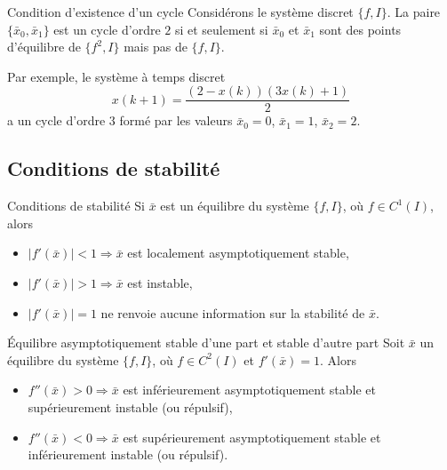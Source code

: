             \begin{theorem}{Condition d'existence d'un cycle}
                Considérons le système discret $\{f, I\}$. La paire $\{\bar{x}_0, \bar{x}_1\}$ est un cycle d'ordre $2$ si et seulement si $\bar{x}_0$ et $\bar{x}_1$ sont des points d'équilibre de $\{f^2, I\}$ mais pas de $\{f, I\}$.
            \end{theorem}
            Par exemple, le système à temps discret
            \begin{equation}
                x(k + 1) = \frac{(2 - x(k))(3x(k) + 1)}{2}
            \end{equation}
            a un cycle d’ordre $3$ formé par les valeurs $\bar{x}_0 = 0$, $\bar{x}_1 = 1$, $\bar{x}_2 = 2$.
        \subsection{Conditions de stabilité}
        \begin{theorem}{Conditions de stabilité}
            Si $\bar{x}$ est un équilibre du système $\{f, I\}$, où $f \in C^1(I)$, alors
            \begin{itemize}
                \item $|f'(\bar{x})| < 1 \Rightarrow \bar{x}$ est localement asymptotiquement stable,
                \item $|f'(\bar{x})| > 1 \Rightarrow \bar{x}$ est instable,
                \item $|f'(\bar{x})| = 1$ ne renvoie aucune information sur la stabilité de $\bar{x}$.
            \end{itemize}
        \end{theorem}
        \begin{theorem}{Équilibre asymptotiquement stable d'une part et stable d'autre part}
            Soit $\bar{x}$ un équilibre du système $\{f, I\}$, où $f \in C^2(I)$ et $f'(\bar{x}) = 1$. Alors
            \begin{itemize}
                \item $f''(\bar{x}) > 0 \Rightarrow \bar{x}$ est inférieurement asymptotiquement stable et supérieurement instable (ou répulsif),
                \item $f''(\bar{x}) < 0 \Rightarrow \bar{x}$ est supérieurement asymptotiquement stable et inférieurement instable (ou répulsif).
            \end{itemize}
        \end{theorem}
